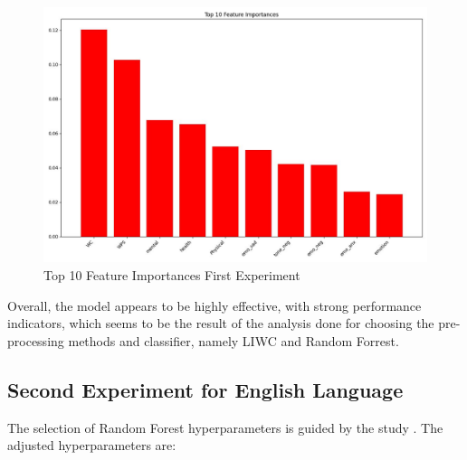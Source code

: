 \begin{figure}[htbp]
	\centering
		\includegraphics[scale=0.5]{LaTeX Bachelor Thesis Depression Signs Detection/figures/metrics/experiment1English/top10features.jpg}
	\caption{Top 10 Feature Importances First Experiment}
	\label{top10FeaturesFirstExperiment}
\end{figure}

Overall, the model appears to be highly effective, with strong performance indicators, which seems to be the result of the analysis done for choosing the pre-processing methods and classifier, namely LIWC \cite{boyd2022development} and Random Forrest.

\subsection{Second Experiment for English Language}
The selection of Random Forest hyperparameters is guided by the study \cite{probst2019hyperparameters}. The adjusted hyperparameters are:

